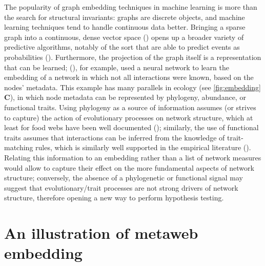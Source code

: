 \begin{refsection}
The popularity of graph embedding techniques in machine learning is more
than the search for structural invariants: graphs are discrete objects,
and machine learning techniques tend to handle continuous data better.
Bringing a sparse graph into a continuous, dense vector space
(\cite{Xu2021Understanding}) opens up a broader variety of predictive
algorithms, notably of the sort that are able to predict events as
probabilities (\cite{Murphy2022Probabilistic}). Furthermore, the
projection of the graph itself is a representation that can be learned;
(\cite{Runghen2021Exploiting}), for example, used a neural network to learn the
embedding of a network in which not all interactions were known, based
on the nodes' metadata. This example has many parallels in ecology (see
\autoref{fig:embedding} \textbf{C}), in which node metadata can be represented by
phylogeny, abundance, or functional traits. Using phylogeny as a source
of information assumes (or strives to capture) the action of
evolutionary processes on network structure, which at least for food
webs have been well documented (\cite{Braga2021Phylogenetic,
DallaRiva2016Exploring, Eklof2016Phylogenetic, Stouffer2007Evidence,
Stouffer2012Evolutionary}); similarly, the use of functional traits
assumes that interactions can be inferred from the knowledge of
trait-matching rules, which is similarly well supported in the empirical
literature (\cite{Bartomeus2013Understanding, Bartomeus2016ComFra,
Goebel2023Body, Gravel2013Inferring}). Relating this information to
an embedding rather than a list of network measures would allow to
capture their effect on the more fundamental aspects of network
structure; conversely, the absence of a phylogenetic or functional
signal may suggest that evolutionary/trait processes are not strong
drivers of network structure, therefore opening a new way to perform
hypothesis testing.

\section{An illustration of metaweb
embedding}\label{an-illustration-of-metaweb-embedding}


\end{refsection}

